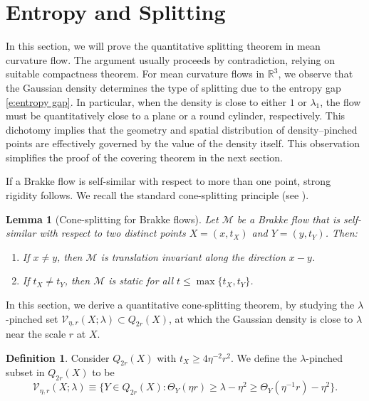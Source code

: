 \documentclass[11pt,reqno]{amsart}
\numberwithin{equation}{section}
\newcommand{\RR}{\mathds{R}}
\newcommand{\cV}{\mathcal{V}}
\newtheorem{lemma}[equation]{Lemma}
\theoremstyle{definition}
\newtheorem{definition}[equation]{Definition}
\theoremstyle{remark}
\theoremstyle{remark}
\theoremstyle{remark}
\theoremstyle{remark}\newtheorem{conjecture}[equation]{Conjecture}
\theoremstyle{remark}\newtheorem{question}[equation]{Question}
\begin{document}
\section{Entropy and Splitting}

In this section, we will prove the quantitative splitting theorem in mean curvature flow. The argument usually proceeds by contradiction, relying on suitable compactness theorem. For mean curvature flows in $\RR^3$, we observe that the Gaussian density determines the type of splitting due to the entropy gap \eqref{e:entropy gap}. In particular, when the density is close to either $1$ or $\lambda_1$, the flow must be quantitatively close to a plane or a round cylinder, respectively. This dichotomy implies that the geometry and spatial distribution of density–pinched points are effectively governed by the value of the density itself. This observation simplifies the proof of the covering theorem in the next section.

If a Brakke flow is self-similar with respect to more than one point, strong rigidity follows.  
We recall the standard cone-splitting principle (see \cite{Wh97, CHN13}).

\begin{lemma}[Cone-splitting for Brakke flows]\label{l:standard split}
Let $\mathcal{M}$ be a Brakke flow that is self-similar with respect to two distinct points
$X = (x, t_X)$ and $Y = (y, t_Y)$. Then:
\begin{enumerate}
    \item If $x \neq y$, then $\mathcal{M}$ is translation invariant along the direction $x - y$.
    \item If $t_X \neq t_Y$, then $\mathcal{M}$ is static for all $t \le \max\{t_X, t_Y\}$.
\end{enumerate}
\end{lemma}




In this section, we derive a quantitative cone-splitting theorem, by studying the $\lambda$-pinched set $\cV_{\eta,r}(X;\lambda) \subset Q_{2r}(X)$, at which the Gaussian density is close to $\lambda$ near the scale $r$ at $X$. 
\begin{definition}
    Consider $Q_{2r}(X)$ with $t_X \ge 4\eta^{-2}r^2$. We define the $\lambda$-pinched subset in $Q_{2r}(X)$ to be 
    \begin{equation}
        \cV_{\eta,r}(X;\lambda) \equiv \{ Y \in Q_{2r}(X) : \Theta_Y(\eta r) \ge \lambda - \eta^2 \ge \Theta_Y(\eta^{-1}r) - \eta^2 \}.
    \end{equation}
\end{definition}
\end{document}
